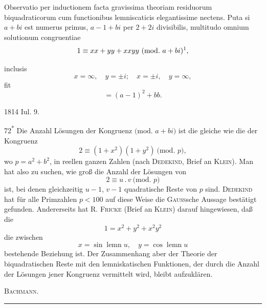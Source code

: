 \noindent\hspace*{\parindent}Observatio per inductionem facta gravissima theoriam residuorum biquadraticorum cum functionibus lemniscaticis elegantissime nectens. Puta si \(a+bi\) est numerus primus, \(a-1+bi\) per \(2+2i\) divisibilis, multitudo omnium solutionum congruentiae
\begingroup\renewcommand{\thefootnote}{[**)]}
\[
1\equiv xx+yy+xxyy\ \text{(mod.\ }a+bi\text{)}\text{\footnotemark},
\]
\renewcommand{\thefootnote}{[**)}
\footnotetext{In der Handschrift steht statt des Kongruenzzeichens \(\equiv\) das Gleichheitszeichen \(=\).]}
\par\endgroup
\noindent inclusis
\[
x=\infty,\quad y=\pm i;\quad x=\pm i,\quad y=\infty,
\]
\noindent fit
\[
=(a-1)^2+bb.
\]
\par\noindent\hfill 1814 Iul. 9.
\par\medskip\noindent\hfill72\textsuperscript{*}
\clearpage{}
\begingroup\small
\indent Die Anzahl Lösungen der Kongruenz \(\text{(mod.\ }a+bi\text{)}\) ist die gleiche wie die der Kongruenz
\[
2\equiv(1+x^2)(1+y^2)\ \text{(mod.\ }p\text{)},
\]
\noindent wo \(p=a^2+b^2\), in reellen ganzen Zahlen (nach \textsc{Dedekind}, Brief an \textsc{Klein}). Man hat also zu suchen, wie groß die Anzahl der Lösungen von
\[
2\equiv u\mathbin{.}v\ \text{(mod.\ }p\text{)}
\]
\noindent ist, bei denen gleichzeitig \(u-1\), \(v-1\) quadratische Reste von \(p\) sind. \textsc{Dedekind} hat für alle Primzahlen \(p<100\) auf diese Weise die \textsc{Gauss}sche Aussage bestätigt gefunden. Andererseits hat R. \textsc{Fricke} (Brief an \textsc{Klein}) darauf hingewiesen, daß die 
\[
1=x^2+y^2+x^2y^2
\]
\noindent die zwischen
\[
x=\sin\operatorname{lemn}u,\quad y=\cos\operatorname{lemn}u
\]
\noindent bestehende Beziehung ist. Der Zusammenhang aber der Theorie der biquadratischen Reste mit den lemniskatischen Funktionen, der durch die Anzahl der Lösungen jener Kongruenz vermittelt wird, bleibt aufzuklären.
\par\noindent\hfill\textsc{Bachmann.}
\par\endgroup
\begin{center}\rule{.18\linewidth}{.3pt}\end{center}

